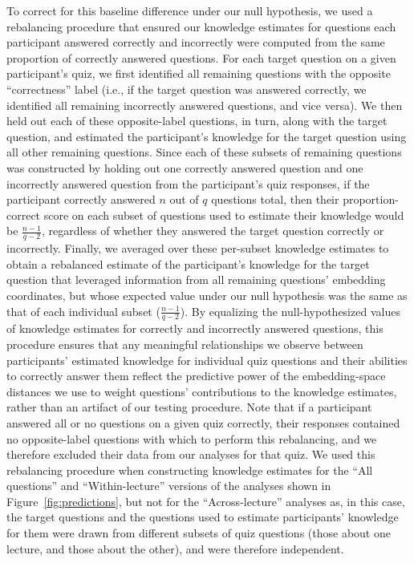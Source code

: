 \documentclass[10pt]{article}
\begin{document}
To correct for this baseline difference under our null hypothesis, we used a
rebalancing procedure that ensured our knowledge estimates for questions each
participant answered correctly and incorrectly were computed from the
same proportion of correctly answered questions. For each target
question on a given participant's quiz, we first identified all remaining questions
with the opposite ``correctness'' label (i.e., if the target question was
answered correctly, we identified all remaining incorrectly answered questions,
and vice versa). We then held out each of these opposite-label questions, in
turn, along with the target question, and estimated the participant's knowledge
for the target question using all other remaining questions. Since each
of these subsets of remaining questions was constructed by holding out one
correctly answered question and one incorrectly answered question from the
participant's quiz responses, if the participant correctly answered $n$ out of $q$
questions total, then their proportion-correct score on each subset of questions
used to estimate their knowledge would be $\frac{n-1}{q-2}$,
regardless of whether they answered the target question correctly or
incorrectly. Finally, we averaged over these per-subset knowledge estimates
to obtain a rebalanced estimate of the participant's knowledge for the target
question that leveraged information from all remaining questions' embedding
coordinates, but whose expected value under our null hypothesis was the same as
that of each individual subset ($\frac{n-1}{q-2}$). By equalizing the
null-hypothesized values of knowledge estimates for correctly and incorrectly
answered questions, this procedure ensures that any meaningful relationships we
observe between participants' estimated knowledge for individual quiz questions
and their abilities to correctly answer them reflect the predictive
power of the embedding-space distances we use to weight questions' contributions
to the knowledge estimates, rather than an artifact of our testing procedure.
Note that if a participant answered all or no questions on a given quiz
correctly, their responses contained no opposite-label questions with which to
perform this rebalancing, and we therefore excluded their data from our analyses
for that quiz. We used this rebalancing procedure when constructing knowledge
estimates for the ``All questions'' and ``Within-lecture'' versions of the
analyses shown in Figure~\ref{fig:predictions}, but not for the
``Across-lecture'' analyses as, in this case, the target questions and the
questions used to estimate participants' knowledge for them were drawn from
different subsets of quiz questions (those about one lecture, and those about
the other), and were therefore independent.
\end{document}
